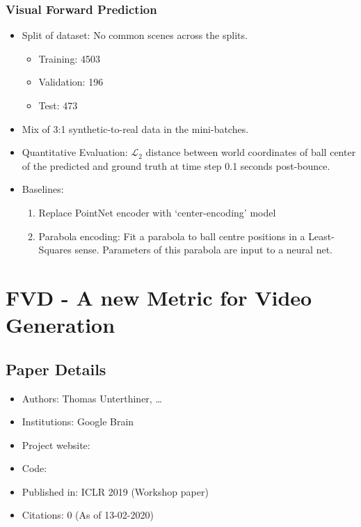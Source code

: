 \documentclass{article}
\begin{document}
    \subsubsection{Visual Forward Prediction}\label{subsubsec:Bounce_and_Learn_Modeling_Scene_Dynamics_with_Real_World_Bounces_(ICLR_2019,_CMU):visual-forward-prediction}
    \begin{itemize}
        \item Split of dataset: No common scenes across the splits.
        \begin{itemize}
            \item Training: 4503
            \item Validation: 196
            \item Test: 473
        \end{itemize}
        \item Mix of 3:1 synthetic-to-real data in the mini-batches.
        \item Quantitative Evaluation: $\mathcal{L}_2$ distance between world coordinates of ball center of the predicted and ground truth at time step 0.1 seconds post-bounce.
        \item Baselines:
        \begin{enumerate}
            \item Replace PointNet encoder with `center-encoding' model
            \item Parabola encoding: Fit a parabola to ball centre positions in a Least-Squares sense.
            Parameters of this parabola are input to a neural net.
        \end{enumerate}
    \end{itemize}
    \newpage


    \section{FVD - A new Metric for Video Generation}\label{sec:FVD_A_new_Metric_for_Video_Generation}
    \subsection*{Paper Details}
    \begin{itemize}
        \item Authors: Thomas Unterthiner, \ldots
        \item Institutions: Google Brain
        \item Project website:
        \item Code:
        \item Published in: ICLR 2019 (Workshop paper)
        \item Citations: 0 (As of 13-02-2020)
    \end{itemize}
\end{document}
